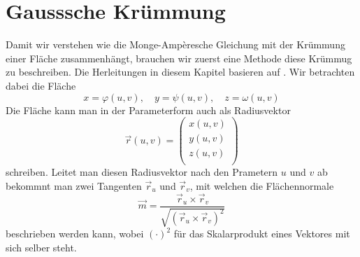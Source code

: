 %
%
%
%
\section{Gausssche Krümmung
\label{mongeampere:section:teil1}}
Damit wir verstehen wie die Monge-Ampèresche Gleichung mit der 
Krümmung einer Fläche zusammenhängt, brauchen wir zuerst eine Methode diese 
Krümmug zu beschreiben.
Die Herleitungen in diesem Kapitel basieren auf \cite{mongeampere:smirnow}.
Wir betrachten dabei die Fläche
\begin{equation}
  x = \varphi(u,v), \quad y = \psi(u,v), \quad z = \omega(u,v)
  \label{mongeampere:areaparam}
\end{equation}
Die Fläche kann man in der Parameterform auch als Radiusvektor
\begin{equation}
  \vec r (u, v) =
  \begin{pmatrix}
    x(u,v) \\
    y(u,v) \\
    z(u,v) \\
  \end{pmatrix}
  \label{mongeampere:rad}
\end{equation}
schreiben.
Leitet man diesen Radiusvektor nach den Prametern $u$ und $v$ ab bekommnt man zwei Tangenten
$\vec r_u$ und $\vec r_v$,
mit welchen die Flächennormale 
\begin{equation}
  \vec m = \frac{\vec r_u \times \vec r_v}{\sqrt{(\vec r_u \times \vec r_v)^2}} 
  \label{mongeampere:norm}
\end{equation}
beschrieben werden kann, wobei $(\cdot)^2$ für das Skalarprodukt eines Vektores mit sich selber steht.

